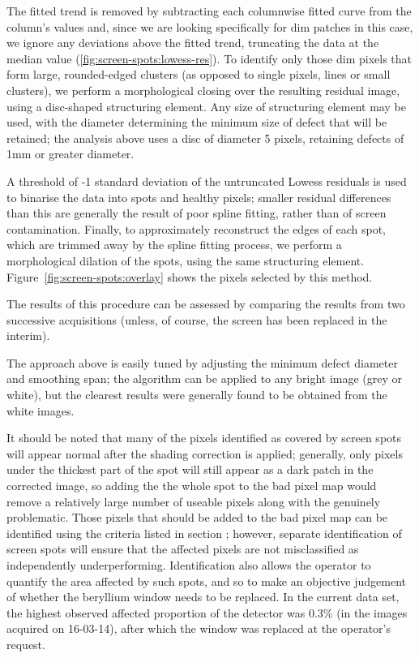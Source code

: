 \documentclass[\main/IO-Pixels.tex]{subfiles}
\begin{document}
The fitted trend is removed by subtracting each columnwise fitted curve from the column's values and, since we are looking specifically for dim patches in this case, we ignore any deviations above the fitted trend, truncating the data at the median value (\ref{fig:screen-spots:lowess-res}). To identify only those dim pixels that form large, rounded-edged clusters (as opposed to single pixels, lines or small clusters), we perform a morphological closing \cite{Vincent1997} over the resulting residual image, using a disc-shaped structuring element. Any size of structuring element may be used, with the diameter determining the minimum size of defect that will be retained; the analysis above uses a disc of diameter 5 pixels, retaining defects of 1mm or greater diameter. 

A threshold of -1 standard deviation of the untruncated Lowess residuals is used to binarise the data into spots and healthy pixels; smaller residual differences than this are generally the result of poor spline fitting, rather than of screen contamination. Finally, to approximately reconstruct the edges of each spot, which are trimmed away by the spline fitting process, we perform a morphological dilation of the spots, using the same structuring element. Figure~\ref{fig:screen-spots:overlay} shows the pixels selected by this method.

The results of this procedure can be assessed by comparing the results from two successive acquisitions (unless, of course, the screen has been replaced in the interim). 

The approach above is easily tuned by adjusting the minimum defect diameter and smoothing span; the algorithm can be applied to any bright image (grey or white), but the clearest results were generally found to be obtained from the white images.

It should be noted that many of the pixels identified as covered by screen spots will appear normal after the shading correction is applied; generally, only pixels under the thickest part of the spot will still appear as a dark patch in the corrected image, so adding the the whole spot to the bad pixel map would remove a relatively large number of useable pixels along with the genuinely problematic. Those pixels that should be added to the bad pixel map can be identified using the criteria listed in section ; however, separate identification of screen spots will ensure that the affected pixels are not misclassified as independently underperforming. Identification also allows the operator to  quantify the area affected by such spots, and so to make an objective judgement of whether the beryllium window needs to be replaced. In the current data set, the highest observed affected proportion of the detector was 0.3\% (in the images acquired on 16-03-14), after which the window was replaced at the operator's request.
\end{document}
